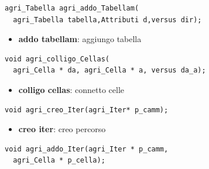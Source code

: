 \documentclass[8pt]{book}
\begin{document}
\begin{spacing}{0.9}
  \begin{small}
    \begin{tcolorbox}
\begin{verbatim}
agri_Tabella agri_addo_Tabellam(
  agri_Tabella tabella,Attributi d,versus dir);
\end{verbatim}
  \end{tcolorbox}
    \end{small}
      \end{spacing}

\begin{itemize}

\item
  \textbf{addo tabellam}: aggiungo tabella
\end{itemize}

\begin{spacing}{0.9}
  \begin{small}
    \begin{tcolorbox}
\begin{verbatim}
void agri_colligo_Cellas(
  agri_Cella * da, agri_Cella * a, versus da_a);
\end{verbatim}
  \end{tcolorbox}
    \end{small}
      \end{spacing}

\begin{itemize}

\item
  \textbf{colligo cellas}: connetto celle
\end{itemize}

\begin{spacing}{0.9}
  \begin{small}
    \begin{tcolorbox}
\begin{verbatim}
void agri_creo_Iter(agri_Iter* p_camm);
\end{verbatim}
  \end{tcolorbox}
    \end{small}
      \end{spacing}

\begin{itemize}

\item
  \textbf{creo iter}: creo percorso
\end{itemize}

\begin{spacing}{0.9}
  \begin{small}
    \begin{tcolorbox}
\begin{verbatim}
void agri_addo_Iter(agri_Iter * p_camm,
  agri_Cella * p_cella);
\end{verbatim}
  \end{tcolorbox}
    \end{small}
      \end{spacing}
\end{document}

